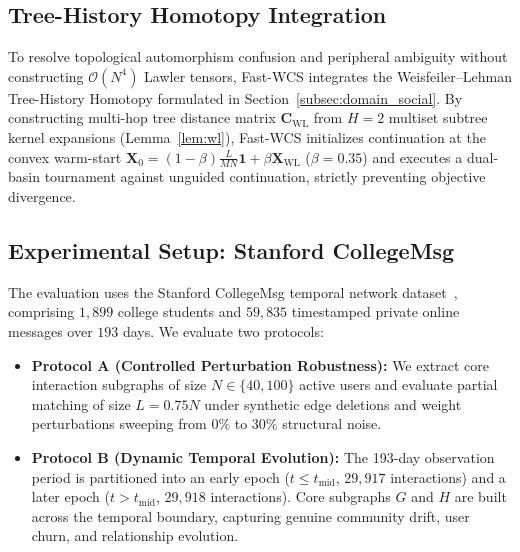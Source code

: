 \documentclass[conference]{IEEEtran}
\begin{document}
\subsection{Tree-History Homotopy Integration}
To resolve topological automorphism confusion and peripheral ambiguity without constructing $\mathcal{O}(N^4)$ Lawler tensors, Fast-WCS integrates the Weisfeiler--Lehman Tree-History Homotopy formulated in Section~\ref{subsec:domain_social}. By constructing multi-hop tree distance matrix $\mathbf{C}_{\text{WL}}$ from $H=2$ multiset subtree kernel expansions (Lemma~\ref{lem:wl}), Fast-WCS initializes continuation at the convex warm-start $\mathbf{X}_0 = (1-\beta)\frac{L}{MN}\mathbf{1} + \beta \mathbf{X}_{\text{WL}}$ ($\beta=0.35$) and executes a dual-basin tournament against unguided continuation, strictly preventing objective divergence.

\subsection{Experimental Setup: Stanford CollegeMsg}
The evaluation uses the Stanford CollegeMsg temporal network dataset~\cite{panzarasa2009}, comprising $1,899$ college students and $59,835$ timestamped private online messages over $193$ days. We evaluate two protocols:
\begin{itemize}
    \item \textbf{Protocol A (Controlled Perturbation Robustness):} We extract core interaction subgraphs of size $N \in \{40, 100\}$ active users and evaluate partial matching of size $L = 0.75 N$ under synthetic edge deletions and weight perturbations sweeping from $0\%$ to $30\%$ structural noise.
    \item \textbf{Protocol B (Dynamic Temporal Evolution):} The 193-day observation period is partitioned into an early epoch ($t \le t_{\text{mid}}$, $29,917$ interactions) and a later epoch ($t > t_{\text{mid}}$, $29,918$ interactions). Core subgraphs $G$ and $H$ are built across the temporal boundary, capturing genuine community drift, user churn, and relationship evolution.
\end{itemize}
\end{document}
